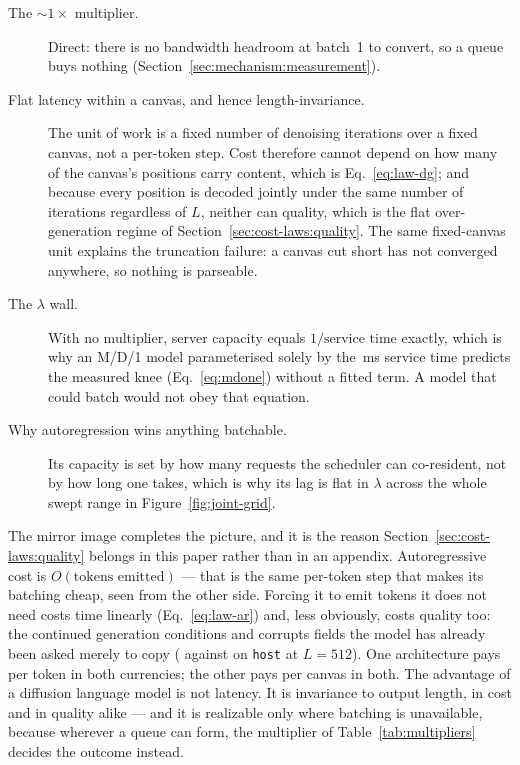\begin{description}
  \item[The $\sim 1\times$ multiplier.] Direct: there is no bandwidth headroom
    at batch~1 to convert, so a queue buys nothing
    (Section~\ref{sec:mechanism:measurement}).
  \item[Flat latency within a canvas, and hence length-invariance.] The unit of
    work is a fixed number of denoising iterations over a fixed canvas, not a
    per-token step. Cost therefore cannot depend on how many of the canvas's
    positions carry content, which is Eq.~\eqref{eq:law-dg}; and because every
    position is decoded jointly under the same number of iterations regardless
    of $L$, neither can quality, which is the flat over-generation regime of
    Section~\ref{sec:cost-laws:quality}. The same fixed-canvas unit explains the
    truncation failure: a canvas cut short has not converged anywhere, so
    nothing is parseable.
  \item[The $\lambda$ wall.] With no multiplier, server capacity equals
    $1/\text{service time}$ exactly, which is why an M/D/1 model parameterised
    solely by the \dgBase{}\,ms service time predicts the measured knee
    (Eq.~\eqref{eq:mdone}) without a fitted term. A model that could batch would
    not obey that equation.
  \item[Why autoregression wins anything batchable.] Its capacity is set by how
    many requests the scheduler can co-resident, not by how long one takes,
    which is why its lag is flat in $\lambda$ across the whole swept range in
    Figure~\ref{fig:joint-grid}.
\end{description}

The mirror image completes the picture, and it is the reason
Section~\ref{sec:cost-laws:quality} belongs in this paper rather than in an
appendix. Autoregressive cost is $O(\text{tokens emitted})$ --- that is the same
per-token step that makes its batching cheap, seen from the other side. Forcing
it to emit tokens it does not need costs time linearly
(Eq.~\eqref{eq:law-ar}) and, less obviously, costs quality too: the continued
generation conditions and corrupts fields the model has already been asked
merely to copy (\arHostFiveTwelve{} against \dgHostFiveTwelve{} on
\texttt{host} at $L=512$). One architecture pays per token in both currencies;
the other pays per canvas in both. The advantage of a diffusion language model
is not latency. It is invariance to output length, in cost and in quality
alike --- and it is realizable only where batching is unavailable, because
wherever a queue can form, the multiplier of Table~\ref{tab:multipliers} decides
the outcome instead.
